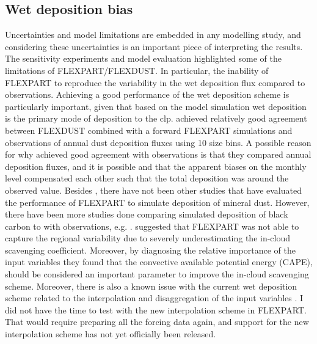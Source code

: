 \subsection{Wet deposition bias}\label{sec:model_uncertainties}
Uncertainties and model limitations are embedded in any modelling study, and considering these uncertainties is an important piece of interpreting the results.  
The sensitivity experiments and model evaluation highlighted some of the limitations of FLEXPART/FLEXDUST. 
In particular, the inability of FLEXPART to reproduce the variability in the wet deposition flux compared to observations. 
Achieving a good performance of the wet deposition scheme is particularly important, given that based on the model simulation wet deposition is the primary mode of deposition to the \acrshort{clp}. 
\textcite{flexdust_ref_2016} achieved relatively good agreement between FLEXDUST combined with a forward FLEXPART simulations and observations of annual dust deposition fluxes using 10 size bins. 
A possible reason for why \textcite{flexdust_ref_2016} achieved good agreement with observations is that they compared annual deposition fluxes, and it is possible and that the apparent biases on the monthly level compensated each other such that the total deposition was around the observed value. 
Besides \textcite{flexdust_ref_2016}, there have not been other studies that have evaluated the performance of FLEXPART to simulate deposition of mineral dust.
However, there have been more studies done comparing simulated deposition of black carbon to with observations, e.g. \textcite{flexpart_wetdep, choi_investigation_2020}. 
\textcite{choi_investigation_2020} suggested that FLEXPART was not able to capture the regional variability due to severely underestimating the in-cloud scavenging coefficient. Moreover, by diagnosing the relative importance of the input variables 
they found that the convective available potential energy (CAPE), should be considered an important parameter to improve the in-cloud scavenging scheme. 
Moreover, there is also a known issue with the current wet deposition scheme related to the interpolation and disaggregation of the input variables \parencite{tipka2021effects}. 
I did not have the time to test with the new interpolation scheme in FLEXPART. 
That would require preparing all the forcing data again, and support for the new interpolation scheme has not yet officially been released.

